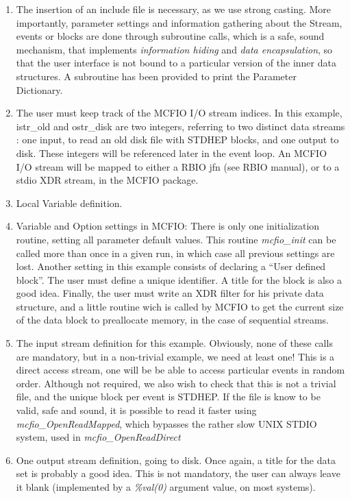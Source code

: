 \begin{enumerate}
\item The insertion of an include file is necessary, as we use strong  casting.
More importantly,  parameter settings and information gathering about
the Stream, events or blocks  are done through subroutine calls,
which is a safe, sound mechanism, that implements {\em information hiding}
and {\em data encapsulation}, so that the user interface is not
bound to a particular version of the inner data structures. A subroutine
has been provided to print the Parameter Dictionary.

\item  The user must keep track of the MCFIO I/O stream indices. In this
example,  istr\_old and ostr\_disk are two integers, referring to two distinct
data streams : one input, to read an old  disk file with STDHEP blocks, and one
output to disk.  These integers will be referenced  later in the event loop.
An MCFIO I/O stream will be mapped to either a RBIO jfn (see RBIO
manual),  or to a stdio XDR stream, in the MCFIO package.

\item Local Variable definition.

\item  Variable and Option settings in MCFIO: There is only one
initialization routine, setting all parameter default values. This routine {\em
mcfio\_init} can be called more than once in a given  run, in which case all
previous settings are lost. Another setting in this example consists of
declaring a  ``User defined block''. The user must define a unique identifier. A
title for the block is also a  good idea. Finally, the user must write an XDR
filter for  his private data structure, and a little routine wich is
called by MCFIO to get the current size of the data block to preallocate
memory, in the case of sequential streams.

\item The input stream definition for this example. Obviously, none of these
calls are mandatory, but in a non-trivial example, we need  at least one! This
is a direct access stream, one will be  be able to access particular  events in
random order. Although not required, we also wish to check that this is  not a
trivial file, and the unique block per event is STDHEP.  If the file is know
to be valid, safe and sound, it is possible to read it faster using {\em
mcfio\_OpenReadMapped}, which bypasses the rather slow UNIX STDIO system, used
in {\em mcfio\_OpenReadDirect}

\item One output stream definition, going to disk. Once again, a title for the
data set is probably a good idea. This is not mandatory, the user can always
leave it blank (implemented by a {\em \%val(0)} argument value, on most
systems).

\end{enumerate}

